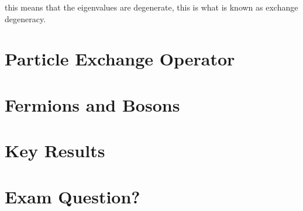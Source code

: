 \noindent this means that the eigenvalues are degenerate, this is what is known as exchange degeneracy.

\section{Particle Exchange Operator}



\section{Fermions and Bosons}


\section{Key Results}



\section{Exam Question?}


